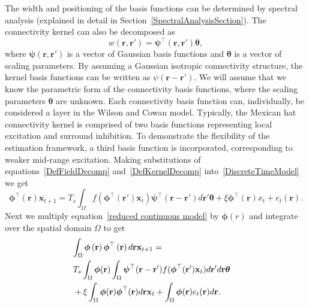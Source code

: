 \documentclass[10pt]{article}
\begin{document}
The width and positioning of the basis functions can be determined by spectral analysis (explained in detail in Section~\ref{SpectralAnalysisSection}). The connectivity kernel can also be decomposed as 
\begin{equation}\label{DefKernelDecomp}
	 w\left(\mathbf{r},\mathbf{r}'\right) =\boldsymbol{\psi}^\top\left(\mathbf{r},\mathbf{r}'\right) \boldsymbol{\theta},
\end{equation}
where $\boldsymbol{\psi}(\mathbf{r},\mathbf{r}')$ is a vector of Gaussian basis functions and $\boldsymbol{\theta}$ is a vector of scaling parameters. By assuming a Gaussian isotropic connectivity structure, the kernel basis functions can be written as $\psi(\mathbf{r}-\mathbf{r}')$. We will assume that we know the parametric form of the connectivity basis functions, where the scaling parameters $\boldsymbol{\theta}$ are unknown. Each connectivity basis function can, individually, be considered a layer in the Wilson and Cowan model. Typically, the Mexican hat connectivity kernel is comprised of two basis functions representing local excitation and surround inhibition. To demonstrate the flexibility of the estimation framework, a third basis function is incorporated, corresponding to weaker mid-range excitation. Making substitutions of equations~\ref{DefFieldDecomp} and~\ref{DefKernelDecomp} into~\ref{DiscreteTimeModel} we get 
\begin{equation}
	\label{reduced continuous model}\boldsymbol{\phi}^{\top}(\mathbf{r})\mathbf{x}_{t+1}= T_s\int_\Omega{f(\boldsymbol{\phi}^{\top}(\mathbf{r}')\mathbf{x}_t )\boldsymbol{\psi}^{\top}(\mathbf{r}-\mathbf{r}')d\mathbf{r}'}\boldsymbol{\theta}
	+ \xi\boldsymbol{\phi}^{\top}(\mathbf{r})x_t + e_t(\mathbf{r}). 
\end{equation}
Next we multiply equation~\ref{reduced continuous model} by $\boldsymbol{\phi}(r)$ and integrate over the spatial domain $\Omega$ to get 
\begin{equation}
    \begin{split}
	\label{StartofReduction}
	\lefteqn{ \int_\Omega {\boldsymbol{\phi} \left(\mathbf{r}\right)\boldsymbol{\phi}^{\top}\left(\mathbf{r}\right) d\mathbf{r}} \mathbf{x}_{t+1}=} \\
 &T_s \int_\Omega {\boldsymbol{\phi} (\mathbf{r}) \int_\Omega {\boldsymbol{\psi}^{\top} (\mathbf{r}-\mathbf{r}') f(\boldsymbol{\phi}^{\top}(\mathbf{r}') \mathbf{x}_t ) d\mathbf{r}'}d\mathbf{r}}\boldsymbol{\theta}  \\ & + \xi\int_\Omega {\boldsymbol{\phi}(\mathbf{r})\boldsymbol{\phi}^{\top}(\mathbf{r})d\mathbf{r}} \mathbf{x}_t+
\int_\Omega{\boldsymbol{\phi} (\mathbf{r}) e_t(\mathbf{r})d\mathbf{r}}. 
\end{split}
\end{equation}
\end{document}
